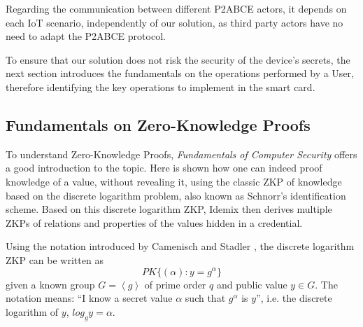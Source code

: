 Regarding the communication between different P2ABCE actors, it depends on each IoT scenario, independently of our solution, as third party actors have no need to adapt the P2ABCE protocol.







To ensure that our solution does not risk the security of the device's secrets, the next section introduces the fundamentals on the operations performed by a User, therefore identifying the key operations to implement in the smart card.

\subsection{Fundamentals on Zero-Knowledge Proofs}


To understand Zero-Knowledge Proofs, \textit{Fundamentals of Computer Security} \cite[Chapter 12]{book:856771} offers a good introduction to the topic. Here is shown how one can indeed proof knowledge of a value, without revealing it, using the classic ZKP of knowledge based on the discrete logarithm problem, also known as Schnorr's identification scheme. Based on this discrete logarithm ZKP, Idemix then derives multiple ZKPs of relations and properties of the values hidden in a credential.


Using the notation introduced by Camenisch and Stadler \cite{camenisch1997efficient}, the discrete logarithm ZKP can be written as 
\[ PK\{ (\alpha) : y = g^\alpha \}  \]
given a known group $G=\left\langle g \right\rangle $ of prime order $q$ and public value $y\in G$. The notation means: ``I know a secret value $\alpha$ such that $g^\alpha$ is $y$'', i.e. the discrete logarithm of $y$, $log_g y = \alpha$.


